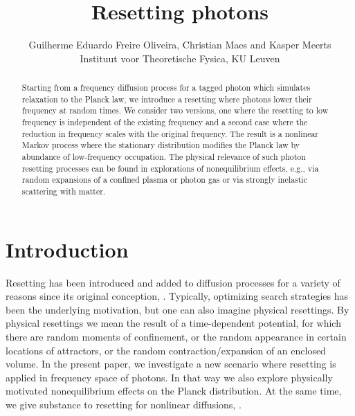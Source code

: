 \documentclass[a4paper,12pt,reqno,superscriptaddress,nofootinbib]{article}
\theoremstyle{plain}
\theoremstyle{definition}
\theoremstyle{remark}
\newcommand{\0}{^{(0)}}
\newcommand{\1}{^{(1)}}
\newcommand{\2}{^{(2)}}
\begin{document}
	\title{Resetting photons}	
	\author{Guilherme Eduardo Freire Oliveira, Christian Maes and Kasper Meerts\\ Instituut voor Theoretische Fysica, KU Leuven}

\begin{abstract}
Starting from a frequency diffusion process for a tagged photon which simulates relaxation to the Planck law, we introduce a resetting where photons lower their frequency at random times.
We consider two versions, one where the resetting to low frequency is independent of the existing frequency and a second case where the reduction in frequency scales with the original frequency.  The result is a nonlinear Markov process where the stationary distribution modifies the Planck law by abundance of low-frequency occupation. The physical relevance of such photon resetting processes can be found in explorations of nonequilibrium effects, e.g., via random expansions of a confined plasma or photon gas or via strongly inelastic scattering with matter.
\end{abstract}
\maketitle

\tableofcontents
\section{Introduction}
Resetting has been introduced and added to diffusion processes for a variety of reasons since its original conception, \cite{evans}.  Typically, optimizing search strategies has been the underlying motivation, but one can also imagine physical resettings.  By physical resettings we mean the result of a time-dependent potential, for which there are random moments of confinement, or the random appearance in certain locations of attractors, or the random contraction/expansion of an enclosed volume.  In the present paper, we investigate a new scenario where resetting is applied in frequency space of photons.  In that way we also explore physically motivated nonequilibrium effects on the Planck distribution.  At the same time, we give substance to resetting for nonlinear diffusions, \cite{przem}.\\
\end{document}
